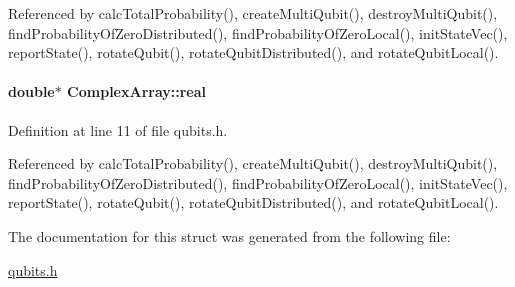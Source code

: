 Referenced by calc\+Total\+Probability(), create\+Multi\+Qubit(), destroy\+Multi\+Qubit(), find\+Probability\+Of\+Zero\+Distributed(), find\+Probability\+Of\+Zero\+Local(), init\+State\+Vec(), report\+State(), rotate\+Qubit(), rotate\+Qubit\+Distributed(), and rotate\+Qubit\+Local().

\paragraph[{\texorpdfstring{real}{real}}]{\setlength{\rightskip}{0pt plus 5cm}double$\ast$ Complex\+Array\+::real}\hypertarget{structComplexArray_a1cf9fd31d6dce5ef618d2bcf3e4f8b69}{}\label{structComplexArray_a1cf9fd31d6dce5ef618d2bcf3e4f8b69}


Definition at line 11 of file qubits.\+h.



Referenced by calc\+Total\+Probability(), create\+Multi\+Qubit(), destroy\+Multi\+Qubit(), find\+Probability\+Of\+Zero\+Distributed(), find\+Probability\+Of\+Zero\+Local(), init\+State\+Vec(), report\+State(), rotate\+Qubit(), rotate\+Qubit\+Distributed(), and rotate\+Qubit\+Local().



The documentation for this struct was generated from the following file\+:\begin{DoxyCompactItemize}
\item 
\hyperlink{qubits_8h}{qubits.\+h}\end{DoxyCompactItemize}
